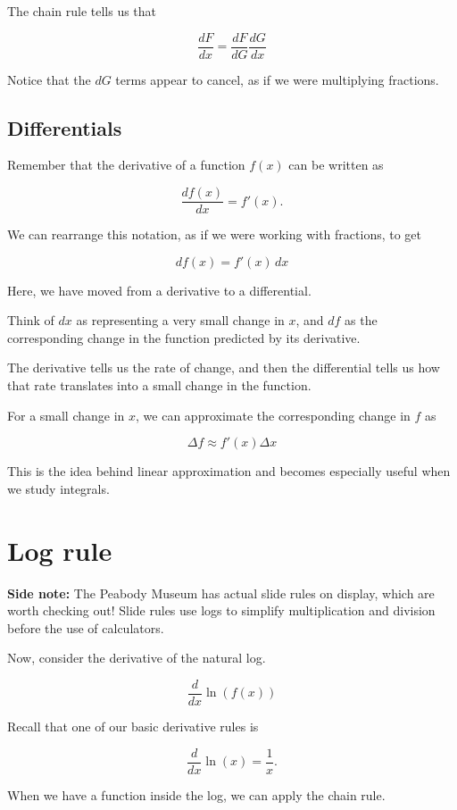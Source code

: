 \documentclass[12pt]{article}
\begin{document}
The chain rule tells us that

\[
    \frac{d F}{d x} = \frac{d F}{d G} \frac{d G}{d x}
\]

Notice that the $d G$ terms appear to cancel,
as if we were multiplying fractions.

\subsection{Differentials}

Remember that the derivative of a function $f(x)$
can be written as

\[
    \frac{df(x)}{dx} = f'(x).
\]

We can rearrange this notation, as if we were working with fractions, to get

\[
    df(x) = f'(x)\,dx
\]

Here, we have moved from a derivative
to a differential.

Think of $dx$ as representing a very small change
in $x$, and $df$ as the corresponding change
in the function predicted by its derivative.

The derivative tells us the rate of change, and then 
the differential tells us how that
rate translates into a small change in the function.

For a small change in $x$, we can approximate
the corresponding change in $f$ as

\[
    \Delta f \approx f'(x)\Delta x
\]

This is the idea behind linear approximation
and becomes especially useful when we study integrals. 


\section{Log rule}

\textbf{Side note:} The Peabody Museum has
actual slide rules on display, which are worth checking
out! Slide rules use logs to simplify
multiplication and division before the use of calculators.

Now, consider the derivative of the natural log.

\[
\frac{d}{dx}\ln(f(x))
\]

Recall that one of our basic derivative rules is

\[
\frac{d}{dx}\ln(x)=\frac{1}{x}.
\]

When we have a function inside the log,
we can apply the chain rule.
\end{document}
